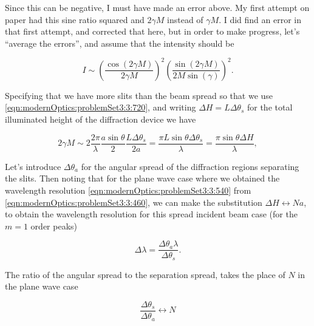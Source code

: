 {Since this can be negative, I must have made an error above.  My first attempt on paper had this sine ratio squared and $2 \gamma M$ instead of $\gamma M$.  I did find an error in that first attempt, and corrected that here, but in order to make progress, let's ``average the errors'', and assume that the intensity should be

\begin{dmath}\label{eqn:modernOptics:problemSet3:3:920}
I \sim \left( \frac{\cos( 2 \gamma M )}{2 \gamma M} \right)^2
\left( \frac{\sin(2 \gamma M) }{ 2 M \sin( \gamma)} \right)^2.
\end{dmath}

Specifying that we have more slits than the beam spread so that we use \ref{eqn:modernOptics:problemSet3:3:720}, and writing $\Delta H = L \Delta \theta_s$ for the total illuminated height of the diffraction device we have

\begin{dmath}\label{eqn:modernOptics:problemSet3:3:940}
2 \gamma M \sim
2 \frac{2 \pi}{\lambda} \frac{a \sin\theta}{2} \frac{L \Delta \theta_s}{2 a} 
=
\frac{\pi L \sin\theta \Delta \theta_s}{\lambda} 
=
\frac{\pi \sin\theta \Delta H}{\lambda},
\end{dmath}

Let's introduce $\Delta \theta_a$ for the angular spread of the diffraction regions separating the slits.  Then noting that for the plane wave case where we obtained the wavelength resolution \ref{eqn:modernOptics:problemSet3:3:540} from \ref{eqn:modernOptics:problemSet3:3:460}, we can make the substitution $\Delta H \leftrightarrow N a$, to obtain the wavelength resolution for this spread incident beam case (for the $m = 1$ order peaks)

\begin{dmath}\label{eqn:modernOptics:problemSet3:3:960}
\boxed{
\Delta \lambda = \frac{\Delta \theta_a \lambda}{\Delta \theta_s}.
}
\end{dmath}

The ratio of the angular spread to the separation spread, takes the place of $N$ in the plane wave case

\begin{dmath}\label{eqn:modernOptics:problemSet3:3:980}
\frac{\Delta \theta_s }{\Delta \theta_a} \leftrightarrow N
\end{dmath}


}
